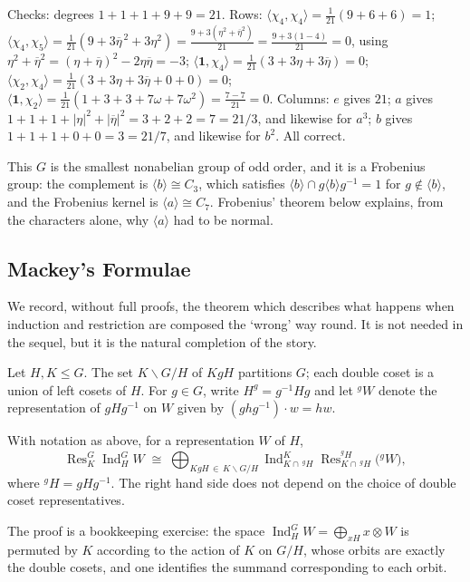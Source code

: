 \documentclass[a4paper]{scrartcl}
\newcommand{\Ind}{\operatorname{Ind}}
\newcommand{\Res}{\operatorname{Res}}
\newcommand{\ip}[2]{\langle #1, #2 \rangle}
\newcommand{\gen}[1]{\langle #1 \rangle}
\begin{document}
Checks: degrees $1+1+1+9+9 = 21$. Rows: $\ip{\chi_4}{\chi_4} = \frac1{21}(9+6+6) = 1$; $\ip{\chi_4}{\chi_5} = \frac1{21}(9 + 3\overline\eta^{\,2}+3\eta^2) = \frac{9 + 3(\eta^2+\overline\eta^2)}{21} = \frac{9+3(1-4)}{21} = 0$, using $\eta^2+\overline\eta^2 = (\eta+\overline\eta)^2 - 2\eta\overline\eta = -3$; $\ip{\mathbf1}{\chi_4} = \frac1{21}(3+3\eta+3\overline\eta) = 0$; $\ip{\chi_2}{\chi_4} = \frac1{21}(3+3\eta+3\overline\eta+0+0) = 0$; $\ip{\mathbf1}{\chi_2} = \frac1{21}(1+3+3+7\omega+7\omega^2) = \frac{7 - 7}{21} = 0$. Columns: $e$ gives $21$; $a$ gives $1+1+1+|\eta|^2+|\overline\eta|^2 = 3+2+2 = 7 = 21/3$, and likewise for $a^3$; $b$ gives $1+1+1+0+0 = 3 = 21/7$, and likewise for $b^2$. All correct.

\begin{remark}
	This $G$ is the smallest nonabelian group of odd order, and it is a Frobenius group: the complement is $\gen b\cong C_3$, which satisfies $\gen b\cap g\gen bg^{-1} = 1$ for $g\notin\gen b$, and the Frobenius kernel is $\gen a\cong C_7$. Frobenius' theorem below explains, from the characters alone, why $\gen a$ had to be normal.
\end{remark}

\subsection{Mackey's Formulae}

We record, without full proofs, the theorem which describes what happens when induction and restriction are composed the `wrong' way round. It is not needed in the sequel, but it is the natural completion of the story.

Let $H, K \leq G$. The set $K\backslash G/H$ of  $KgH$ partitions $G$; each double coset is a union of left cosets of $H$. For $g \in G$, write $H^g = g^{-1}Hg$ and let ${}^gW$ denote the representation of $gHg^{-1}$ on $W$ given by $(ghg^{-1})\cdot w = hw$.

\begin{theorem}
	With notation as above, for a representation $W$ of $H$,
	$$\Res^G_K\Ind_H^GW \; \cong \; \bigoplus_{KgH\,\in\, K\backslash G/H}\Ind^K_{K\cap\, {}^gH}\Res^{{}^gH}_{K\cap\, {}^gH}\big({}^gW\big),$$
	where ${}^gH = gHg^{-1}$. The right hand side does not depend on the choice of double coset representatives.
\end{theorem}

The proof is a bookkeeping exercise: the space $\Ind_H^GW = \bigoplus_{xH}x\otimes W$ is permuted by $K$ according to the action of $K$ on $G/H$, whose orbits are exactly the double cosets, and one identifies the summand corresponding to each orbit.
\end{document}

